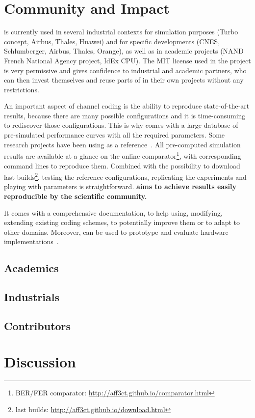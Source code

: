 \section{Community and Impact}

\AFFECT is currently used in several industrial contexts for simulation purposes
(Turbo concept, Airbus, Thales, Huawei) and for specific developments (CNES,
Schlumberger, Airbus, Thales, Orange), as well as in academic projects (NAND
French National Agency project, IdEx CPU). The MIT license used in the project
is very permissive and gives confidence to industrial and academic partners, who
can then invest themselves and reuse parts of \AFFECT in their own projects
without any restrictions.

An important aspect of channel coding is the ability to reproduce
state-of-the-art results, because there are many possible configurations and it
is time-consuming to rediscover those configurations. This is why \AFFECT comes
with a large database of pre-simulated performance curves with all the required
parameters. Some research projects have been using \AFFECT as a
reference~\cite{Leonardon2018a,Leonardon2018b,Florian2018,Pignoly2018,
Ghanaatian2018,Poulenard2018,Cavatassi2019a,Cavatassi2019b,Cenova2019,
Guermouche2019,Krainyk2019,Wang2019,Wang2019a,Hsieh2020,Rush2020,Tasdighi2020}.
All pre-computed simulation results are available at a glance on the online
comparator\footnote{BER/FER comparator:
\url{http://aff3ct.github.io/comparator.html}}, with corresponding command lines
to reproduce them. Combined with the possibility to download \AFFECT last
builds\footnote{\AFFECT last builds:
\url{http://aff3ct.github.io/download.html}}, testing the reference
configurations, replicating the experiments and playing with parameters is
straightforward. \textbf{\AFFECT aims to achieve results easily reproducible by
the scientific community.}

It comes with a comprehensive documentation, to help using, modifying, extending
existing coding schemes, to potentially improve them or to adapt to other
domains. Moreover, \AFFECT can be used to prototype and evaluate hardware
implementations~\cite{Cassagne2017a}.

\subsection{Academics}
\subsection{Industrials}
\subsection{Contributors}

\section{Discussion}
